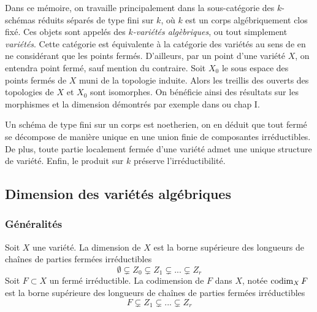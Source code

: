 Dans ce mémoire, on travaille principalement dans la sous-catégorie des $k$-schémas réduits séparés de type fini sur $k$, où $k$ est un corps algébriquement clos fixé. Ces objets sont appelés des \textit{$k$-variétés algèbriques}, ou tout simplement \textit{variétés}.  Cette catégorie est équivalente à la catégorie des variétés au sens de \cite{LAGSpringer} en ne considérant que les points fermés. D'ailleurs, par un point d'une variété $X$, on entendra point fermé, sauf mention du contraire. Soit $X_0$ le sous espace des points fermés de $X$ muni de la topologie induite. Alors les treillis des ouverts des topologies de $X$ et $X_0$ sont isomorphes. On bénéficie ainsi des résultats sur les morphismes et la dimension démontrés par exemple dans \cite{LAGSpringer} ou \cite{MumfordRedBook} chap I.

Un schéma de type fini sur un corps est noetherien, on en déduit que tout fermé se décompose de manière unique en une union finie de composantes irréductibles. De plus, toute partie localement fermée d'une variété admet une unique structure de variété. Enfin, le produit sur $k$ préserve l'irréductibilité.

\subsection{Dimension des variétés algébriques}

\subsubsection{Généralités}

\begin{defn}
Soit $X$ une variété. La dimension de $X$ est la borne supérieure des longueurs de chaînes de parties fermées irréductibles
$$\emptyset \varsubsetneq Z_0 \varsubsetneq Z_1 \varsubsetneq ... \varsubsetneq Z_r$$
Soit $F\subset X$ un fermé irréductible. La codimension de $F$ dans $X$, notée $\operatorname{codim}_X F$ est la borne supérieure des longueurs de chaînes de parties fermées irréductibles
$$F \varsubsetneq Z_1 \varsubsetneq ... \varsubsetneq Z_r$$
\end{defn}

